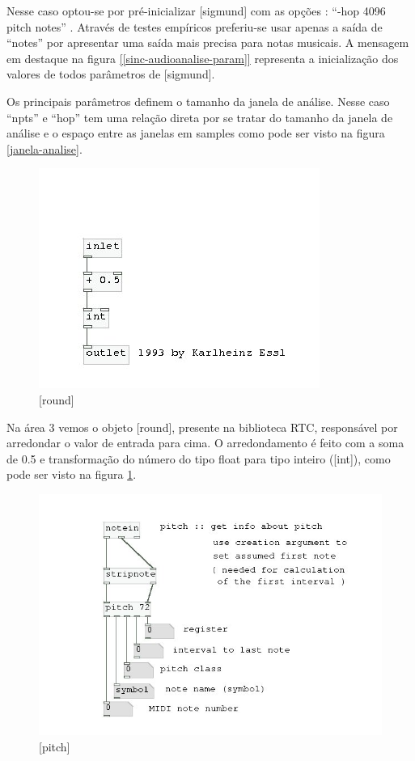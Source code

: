 \documentclass{ppgmus}
\begin{document}
Nesse caso optou-se por pré-inicializar [sigmund\texttildelow] com as
opções : ``-hop 4096 pitch notes'' . Através de testes empíricos preferiu-se
usar apenas a saída de ``notes'' por apresentar uma saída mais precisa para notas 
musicais. A mensagem em destaque na figura \ref{[sinc-audioanalise-param]} representa
a inicialização dos valores de todos parâmetros de [sigmund\texttildelow].

Os principais parâmetros definem o tamanho da janela de análise.
Nesse caso ``npts'' e ``hop'' tem uma relação direta
por se tratar do tamanho da janela de análise e o espaço
entre as janelas em samples como pode ser visto na figura \ref{janela-analise}.





\begin{figure}
\includegraphics[scale=.7]{round}
\caption{[round]}
\label{round}
\end{figure}


Na área 3 vemos o objeto [round], presente na biblioteca RTC, responsável
por arredondar o valor de entrada para cima. O arredondamento é feito com
a soma de 0.5 e transformação do número do tipo float para tipo inteiro ([int]),
como pode ser visto na figura \ref{round}.


\begin{figure}
\includegraphics[scale=.7]{pitch}
\caption{[pitch]}
\label{pitch}
\end{figure}
\end{document}
